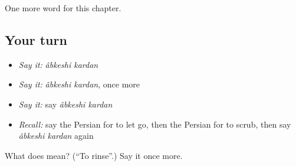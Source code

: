 \begin{grammarlens}[title={What you've built}]
One more word for this chapter.
\end{grammarlens}

\subsection*{Your turn}
\begin{itemize}
\raggedright
  \item \emph{Say it:} \emph{âbkeshi kardan}
  \item \emph{Say it:} \emph{âbkeshi kardan}, once more
  \item \emph{Say it:} say \emph{âbkeshi kardan}
  \item \emph{Recall:} say the Persian for to let go, then the Persian for to scrub, then say \emph{âbkeshi kardan} again
\end{itemize}

\begin{tcolorbox}[breakable,colback=teal!4,colframe=teal!35!black,title={Before you move on}]
What does   mean? (\textquotedblleft{}To rinse\textquotedblright{}.) Say it once more.
\end{tcolorbox}
